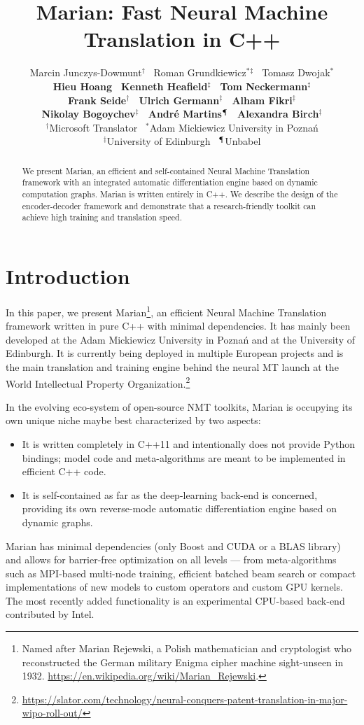 \documentclass[11pt,a4paper]{article}
\title{Marian: Fast Neural Machine Translation in C++}
\author{Marcin Junczys-Dowmunt$^{\dagger}$ \, Roman Grundkiewicz$^{*}$$^{\ddagger}$ \, Tomasz Dwojak$^{*}$ \\ {\bf Hieu Hoang \, Kenneth Heafield$^{\ddagger}$ \, Tom Neckermann$^{\ddagger}$ }  \\  {\bf Frank Seide$^{\dagger}$ \, Ulrich Germann$^{\ddagger}$ \, Alham Fikri$^{\ddagger}$ } \\ { \bf Nikolay Bogoychev$^{\ddagger}$ \, Andr\'{e} Martins$^{\mathparagraph}$ \, Alexandra Birch$^{\ddagger}$} \\[2mm]
$^{\dagger}$Microsoft Translator \, $^{*}$Adam Mickiewicz University in Pozna\'{n} \\ $^{\ddagger}$University of Edinburgh \,  $^{\mathparagraph}$Unbabel }
\date{}
\begin{document}
\maketitle
\begin{abstract}
We present Marian, an efficient and self-contained Neural Machine Translation framework with an integrated automatic differentiation engine based on dynamic computation graphs. Marian is written entirely in C++. We describe the design of the encoder-decoder framework and demonstrate that a research-friendly toolkit can achieve high training and translation speed.  
\end{abstract}

\section{Introduction}

In this paper, we present Marian\footnote{Named after Marian Rejewski, a Polish mathematician and cryptologist who reconstructed the German military Enigma cipher machine sight-unseen in 1932. \url{https://en.wikipedia.org/wiki/Marian_Rejewski}.}, an efficient Neural Machine Translation framework written in pure C++ with minimal dependencies. It has mainly been developed at the Adam Mickiewicz University in Pozna\'{n} and at the University of Edinburgh. It is currently being deployed in multiple European projects and is the main translation and training engine behind the neural MT launch at the World Intellectual Property Organization.\footnote{\url{https://slator.com/technology/neural-conquers-patent-translation-in-major-wipo-roll-out/}}

In the evolving eco-system of open-source NMT toolkits, Marian is occupying its own unique niche maybe best characterized by two aspects: 
\begin{itemize}
\item It is written completely in C++11 and intentionally does not provide Python bindings; model code and meta-algorithms are meant to be implemented in efficient C++ code.
\item It is self-contained as far as the deep-learning back-end is concerned, providing its own reverse-mode automatic differentiation engine based on dynamic graphs.
\end{itemize}

Marian has minimal dependencies (only Boost and CUDA or a BLAS library) and allows for barrier-free optimization on all levels --- from meta-algorithms such as MPI-based multi-node training, efficient batched beam search or compact implementations of new models to custom operators and custom GPU kernels. The most recently added functionality is an experimental CPU-based back-end contributed by Intel. 
\end{document}
